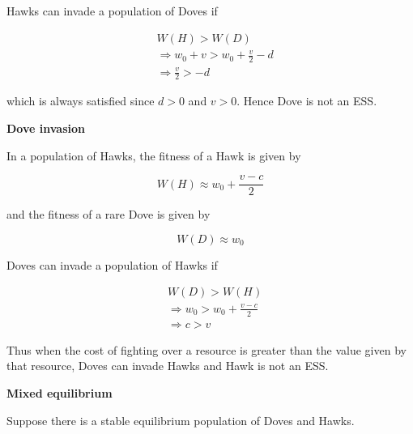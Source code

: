 \documentclass{article}
\begin{document}
Hawks can invade a population of Doves if

\begin{align*}
    &W(H) > W(D) \\
    &\Rightarrow w_0 + v > w_0 + \frac{v}{2} - d \\
    &\Rightarrow \frac{v}{2} > - d
\end{align*}

which is always satisfied since $d > 0$ and $v > 0$. Hence Dove is not
an ESS.

\textbf{Dove invasion}

In a population of Hawks, the fitness of a Hawk is given by

\begin{equation*}
    W(H) \approx w_0 + \frac{v - c}{2}
\end{equation*}

and the fitness of a rare Dove is given by

\begin{equation*}
    W(D) \approx w_0
\end{equation*}

Doves can invade a population of Hawks if

\begin{align*}
    &W(D) > W(H) \\
    &\Rightarrow w_0 > w_0 + \frac{v - c}{2} \\
    &\Rightarrow c > v
\end{align*}

Thus when the cost of fighting over a resource is greater than the value
given by that resource, Doves can invade Hawks and Hawk is not an ESS.

\textbf{Mixed equilibrium}

Suppose there is a stable equilibrium population of Doves and Hawks.
\end{document}
